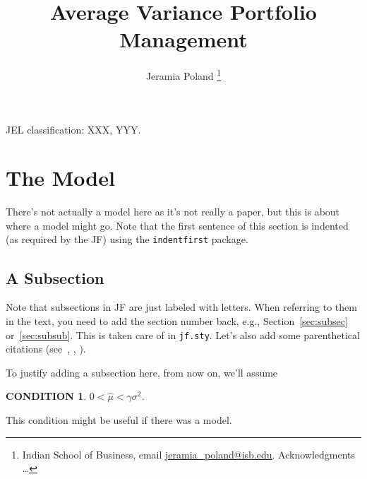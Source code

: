 \documentclass[11pt]{article}
\newtheorem{condition}{CONDITION}
\begin{document}
\onehalfspacing      %
\renewcommand{\footnote}{\endnote}  %

\author{Jeramia Poland \thanks{\rm Indian School of Business, email \href{mailto:jeramia_poland@isb.edu}{jeramia\_poland@isb.edu}. Acknowledgments \ldots}}

\title{\Large \bf Average Variance Portfolio Management}

\date{}              %


\maketitle
\thispagestyle{empty}

\bigskip



\medskip

\noindent JEL classification: XXX, YYY.

\clearpage



\section{The Model} \label{sec:Model}

There's not actually a model here as it's not really a paper, but this is about where a model might go. Note that the first sentence of this section is indented (as required by the JF) using the \texttt{indentfirst} package.

\subsection{A Subsection}

Note that subsections in JF are just labeled with letters.  When referring to them in the text, you need to add the section number back, e.g., Section~\ref{sec:subsec} or~\ref{sec:subsub}. This is taken care of in \texttt{jf.sty}. Let's also add some parenthetical citations (see~\cite{Stanton:95}, \cite{CarpenterStantonWallace:12}, \cite{Campbell:03}). 

To justify adding a subsection here, from now on, we'll assume
\begin{condition}\label{cond:rates}
$0 <  \hat{\mu} < \gamma\sigma^2$.
\vspace{3mm}
\end{condition}
This condition might be useful if there was a model. 
\end{document}
